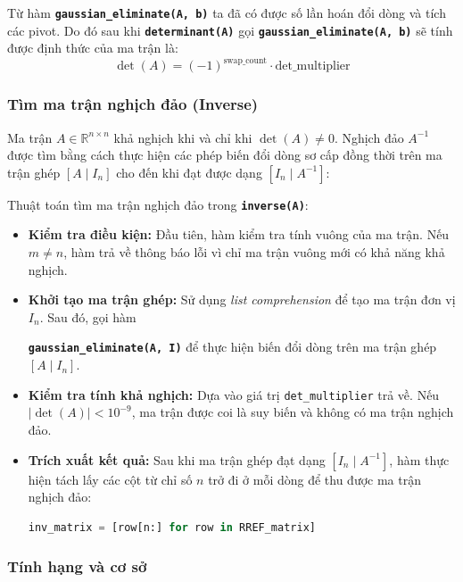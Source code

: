 \documentclass[12pt,a4paper]{article}
\begin{document}
Từ hàm \texttt{\textbf{gaussian\_eliminate(A, b)}} ta đã có được số lần hoán đổi dòng và tích các pivot. Do đó sau khi \texttt{\textbf{determinant(A)}} gọi \texttt{\textbf{gaussian\_eliminate(A, b)}} sẽ tính được định thức của ma trận là: 
\begin{equation}
    \det(A) = (-1)^{\text{swap\_count}} \cdot \text{det\_multiplier}
\end{equation}

\subsubsection{Tìm ma trận nghịch đảo (Inverse)}
Ma trận $A \in \mathbb{R}^{n \times n}$ khả nghịch khi và chỉ khi $\det(A) \neq 0$. Nghịch đảo $A^{-1}$ được tìm bằng cách thực hiện các phép biến đổi dòng sơ cấp đồng thời trên ma trận ghép $[A \mid I_n]$ cho đến khi đạt được dạng $[I_n \mid A^{-1}]$:

Thuật toán tìm ma trận nghịch đảo trong \texttt{\textbf{inverse(A)}}:
\begin{itemize}
    \item \textbf{Kiểm tra điều kiện:} Đầu tiên, hàm kiểm tra tính vuông của ma trận. Nếu $m \neq n$, hàm trả về thông báo lỗi vì chỉ ma trận vuông mới có khả năng khả nghịch.
    
    \item \textbf{Khởi tạo ma trận ghép:} Sử dụng \textit{list comprehension} để tạo ma trận đơn vị $I_n$. Sau đó, gọi hàm 
    
    \texttt{\textbf{gaussian\_eliminate(A, I)}} để thực hiện biến đổi dòng trên ma trận ghép $[A \mid I_n]$.
    
    \item \textbf{Kiểm tra tính khả nghịch:} Dựa vào giá trị \texttt{det\_multiplier} trả về. Nếu $|\det(A)| < 10^{-9}$, ma trận được coi là suy biến và không có ma trận nghịch đảo.
    
    \item \textbf{Trích xuất kết quả:} Sau khi ma trận ghép đạt dạng $[I_n \mid A^{-1}]$, hàm thực hiện tách lấy các cột từ chỉ số $n$ trở đi ở mỗi dòng để thu được ma trận nghịch đảo:
    
    \begin{lstlisting}[language=Python]
    inv_matrix = [row[n:] for row in RREF_matrix]
    \end{lstlisting}
\end{itemize}

\subsubsection{Tính hạng và cơ sở}
\end{document}

